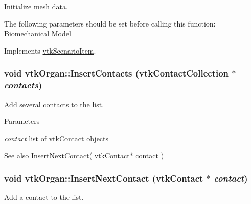 Initialize mesh data. 

The following parameters should be set before calling this function: Biomechanical Model 

Implements \hyperlink{classvtkScenarioItem_a87f01894de62f23433aa2eb3f995c216}{vtkScenarioItem}.

\hypertarget{classvtkOrgan_aa61c5704ac5458ee9e5bfa6aed6014ce}{
\subsubsection[{InsertContacts}]{\setlength{\rightskip}{0pt plus 5cm}void vtkOrgan::InsertContacts ({\bf vtkContactCollection} $\ast$ {\em contacts})}}
\label{classvtkOrgan_aa61c5704ac5458ee9e5bfa6aed6014ce}


Add several contacts to the list. 


\begin{DoxyParams}{Parameters}
\item[{\em contact}]list of \hyperlink{classvtkContact}{vtkContact} objects \end{DoxyParams}
\begin{DoxySeeAlso}{See also}
\hyperlink{classvtkOrgan_aa10b506b56aab4c3b8050c9aaa179c5b}{InsertNextContact( vtkContact$\ast$ contact )} 
\end{DoxySeeAlso}
\hypertarget{classvtkOrgan_aa10b506b56aab4c3b8050c9aaa179c5b}{
\subsubsection[{InsertNextContact}]{\setlength{\rightskip}{0pt plus 5cm}void vtkOrgan::InsertNextContact ({\bf vtkContact} $\ast$ {\em contact})}}
\label{classvtkOrgan_aa10b506b56aab4c3b8050c9aaa179c5b}


Add a contact to the list. 


